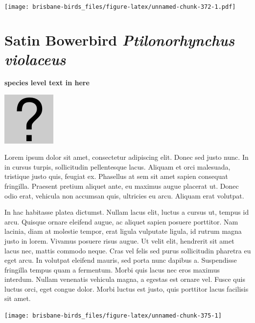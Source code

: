 \documentclass[]{book}
\let\origfigure\figure
\let\endorigfigure\endfigure
\renewenvironment{figure}[1][2] {
  \expandafter\origfigure\expandafter[H]
} {
  \endorigfigure
}
\begin{document}
\begin{figure}
\centering
\texttt{[image: brisbane-birds\_files/figure-latex/unnamed-chunk-372-1.pdf]}
\caption{\label{fig:unnamed-chunk-372}insert figure caption}
\end{figure}

\section{\texorpdfstring{Satin Bowerbird \emph{Ptilonorhynchus
violaceus}}{Satin Bowerbird Ptilonorhynchus violaceus}}\label{satin-bowerbird-ptilonorhynchus-violaceus}

\textbf{species level text in here}

\begin{figure}
\centering
\includegraphics{assets/missing.png}
\caption{No image for species}
\end{figure}

Lorem ipsum dolor sit amet, consectetur adipiscing elit. Donec sed justo
nunc. In in cursus turpis, sollicitudin pellentesque lacus. Aliquam et
orci malesuada, tristique justo quis, feugiat ex. Phasellus at sem sit
amet sapien consequat fringilla. Praesent pretium aliquet ante, eu
maximus augue placerat ut. Donec odio erat, vehicula non accumsan quis,
ultricies eu arcu. Aliquam erat volutpat.

In hac habitasse platea dictumst. Nullam lacus elit, luctus a cursus ut,
tempus id arcu. Quisque ornare eleifend augue, ac aliquet sapien posuere
porttitor. Nam lacinia, diam at molestie tempor, erat ligula vulputate
ligula, id rutrum magna justo in lorem. Vivamus posuere risus augue. Ut
velit elit, hendrerit sit amet lacus nec, mattis commodo neque. Cras vel
felis sed purus sollicitudin pharetra eu eget arcu. In volutpat eleifend
mauris, sed porta nunc dapibus a. Suspendisse fringilla tempus quam a
fermentum. Morbi quis lacus nec eros maximus interdum. Nullam venenatis
vehicula magna, a egestas est ornare vel. Fusce quis luctus orci, eget
congue dolor. Morbi luctus est justo, quis porttitor lacus facilisis sit
amet.

\begin{figure}
\texttt{[image: brisbane-birds\_files/figure-latex/unnamed-chunk-375-1]} \caption{insert figure caption}\label{fig:unnamed-chunk-375}
\end{figure}
\end{document}
